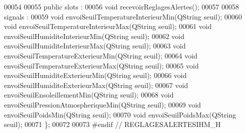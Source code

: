 \begin{DoxyCode}
00054 
00055 \textcolor{keyword}{public} slots :
00056     \textcolor{keywordtype}{void} recevoirReglagesAlertes();
00057 
00058 signals :
00059     \textcolor{keywordtype}{void} envoiSeuilTemperatureInterieurMin(QString seuil);
00060     \textcolor{keywordtype}{void} envoiSeuilTemperatureInterieurMax(QString seuil);
00061     \textcolor{keywordtype}{void} envoiSeuilHumiditeInterieurMin(QString seuil);
00062     \textcolor{keywordtype}{void} envoiSeuilHumiditeInterieurMax(QString seuil);
00063     \textcolor{keywordtype}{void} envoiSeuilTemperatureExterieurMin(QString seuil);
00064     \textcolor{keywordtype}{void} envoiSeuilTemperatureExterieurMax(QString seuil);
00065     \textcolor{keywordtype}{void} envoiSeuilHumiditeExterieurMin(QString seuil);
00066     \textcolor{keywordtype}{void} envoiSeuilHumiditeExterieurMax(QString seuil);
00067     \textcolor{keywordtype}{void} envoiSeuilEnsoleillementMin(QString seuil);
00068     \textcolor{keywordtype}{void} envoiSeuilPressionAtmospheriqueMin(QString seuil);
00069     \textcolor{keywordtype}{void} envoiSeuilPoidsMin(QString seuil);
00070     \textcolor{keywordtype}{void} envoiSeuilPoidsMax(QString seuil);
00071 \};
00072 
00073 \textcolor{preprocessor}{#endif // REGLAGESALERTESIHM\_H}
\end{DoxyCode}
